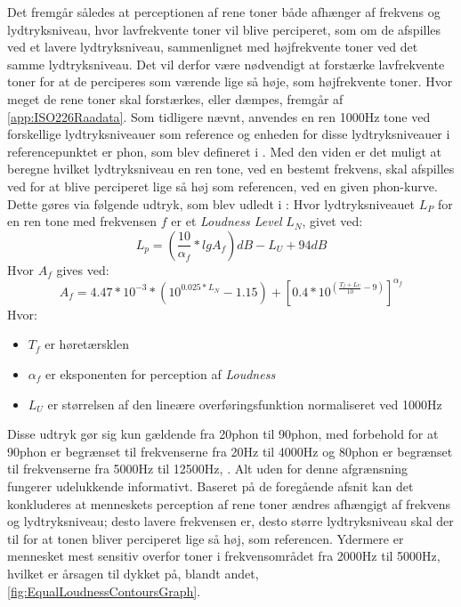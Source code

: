 Det fremgår således at perceptionen af rene toner både afhænger af frekvens og lydtryksniveau, hvor lavfrekvente toner vil blive perciperet, som om de afspilles ved et lavere lydtryksniveau, sammenlignet med højfrekvente toner ved det samme lydtryksniveau. Det vil derfor være nødvendigt at forstærke lavfrekvente toner for at de perciperes som værende lige så høje, som højfrekvente toner. Hvor meget de rene toner skal forstærkes, eller dæmpes, fremgår af \autoref{app:ISO226Raadata}.
\blankline
Som tidligere nævnt, anvendes en ren 1000Hz tone ved forskellige lydtryksniveauer som reference og enheden for disse lydtryksniveauer i referencepunktet er phon, som blev defineret i . Med den viden er det muligt at beregne hvilket lydtryksniveau en ren tone, ved en bestemt frekvens, skal afspilles ved for at blive perciperet lige så høj som referencen, ved en given phon-kurve. Dette gøres via følgende udtryk, som blev udledt i \textcite[s. 2]{STD:ISO226}:
\blankline
Hvor lydtryksniveauet $L_{P}$ for en ren tone med frekvensen $f$ er et \textit{Loudness Level} $L_{N}$, givet ved: 
%
\begin{equation} \label{eq:SPL_Fra_Loudness}
	 L_p=\left(\frac{10}{\alpha_f} * lg A_f\right) dB - L_U + 94dB		
\end{equation}
\noindent
%
Hvor $A_{f}$ gives ved:
%
\begin{equation} \label{eq:SPL_Fra_Loudness_Tilfoejelse}
	A_f = 4.47 * 10^{-3} * \left(10^{0.025*L_N} - 1.15\right) + \left[0.4*10^{\left(\frac{T_f + L_U}{10} - 9\right)}\right]^{\alpha_f}
\end{equation}
\noindent
%
Hvor:
\begin{itemize}
	\item[] $T_f$ er høretærsklen
	\item[] $\alpha_f$ er eksponenten for perception af \textit{Loudness}
	\item[] $L_U$ er størrelsen af den lineære overføringsfunktion normaliseret ved 1000Hz\\[5mm]
\end{itemize}
\noindent
%
Disse udtryk gør sig kun gældende fra 20phon til 90phon, med forbehold for at 90phon er begrænset til frekvenserne fra 20Hz til 4000Hz og 80phon er begrænset til frekvenserne fra 5000Hz til 12500Hz, \parencite[s. 2]{STD:ISO226}. Alt uden for denne afgrænsning fungerer udelukkende informativt.
\blankline
Baseret på de foregående afsnit kan det konkluderes at menneskets perception af rene toner ændres afhængigt af frekvens og lydtryksniveau; desto lavere frekvensen er, desto større lydtryksniveau skal der til for at tonen bliver perciperet lige så høj, som referencen. Ydermere er mennesket mest sensitiv overfor toner i frekvensområdet fra 2000Hz til 5000Hz, hvilket er årsagen til dykket på, blandt andet, \autoref{fig:EqualLoudnessContoursGraph}. 
%
\newpage
\noindent